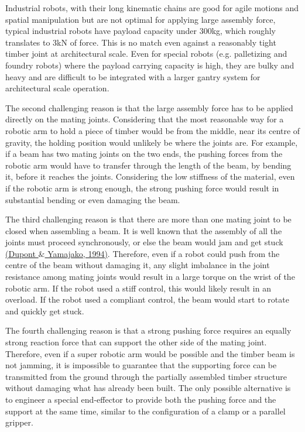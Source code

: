 \documentclass[11pt]{book}
\begin{document}
Industrial robots, with their long kinematic chains are good for agile motions and spatial manipulation but are not optimal for applying large assembly force, typical industrial robots have payload capacity under 300kg, which roughly translates to 3kN of force. This is no match even against a reasonably tight timber joint at architectural scale. Even for special robots (e.g. palletizing and foundry robots) where the payload carrying capacity is high, they are bulky and heavy and are difficult to be integrated with a larger gantry system for architectural scale operation. 

The second challenging reason is that the large assembly force has to be applied directly on the mating joints. Considering that the most reasonable way for a robotic arm to hold a piece of timber would be from the middle, near its centre of gravity, the holding position would unlikely be where the joints are. For example, if a beam has two mating joints on the two ends, the pushing forces from the robotic arm would have to transfer through the length of the beam, by bending it, before it reaches the joints. Considering the low stiffness of the material, even if the robotic arm is strong enough, the strong pushing force would result in substantial bending or even damaging the beam. 

The third challenging reason is that there are more than one mating joint to be closed when assembling a beam. It is well known that the assembly of all the joints must proceed synchronously, or else the beam would jam and get stuck \href{https://www.zotero.org/google-docs/?tb7dgL}{(Dupont $\&$ Yamajako, 1994)}. Therefore, even if a robot could push from the centre of the beam without damaging it, any slight imbalance in the joint resistance among mating joints would result in a large torque on the wrist of the robotic arm. If the robot used a stiff control, this would likely result in an overload. If the robot used a compliant control, the beam would start to rotate and quickly get stuck. 

The fourth challenging reason is that a strong pushing force requires an equally strong reaction force that can support the other side of the mating joint. Therefore, even if a super robotic arm would be possible and the timber beam is not jamming, it is impossible to guarantee that the supporting force can be transmitted from the ground through the partially assembled timber structure without damaging what has already been built. The only possible alternative is to engineer a special end-effector to provide both the pushing force and the support at the same time, similar to the configuration of a clamp or a parallel gripper.
\end{document}
